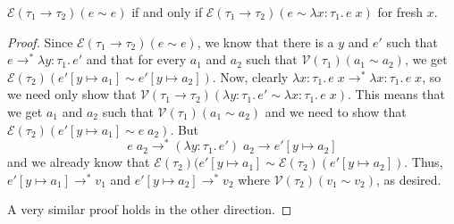 \documentclass{lecturenotes}
\newcommand{\tabs}[3]{\ensuremath{\lambda #1 \colon #2.\,#3}}
\newcommand{\app}[2]{\ensuremath{#1\;#2}}
\begin{document}
\begin{lem}
  $\mathcal{E}(\tau_1 \to \tau_2)(e \sim e)$ if and only if $\mathcal{E}(\tau_1 \to \tau_2)(e \sim \tabs{x}{\tau_1}{\app{e}{x}})$ for fresh $x$.
\end{lem}
\begin{proof}
  Since $\mathcal{E}(\tau_1 \to \tau_2)(e \sim e)$, we know that there is a $y$ and $e'$ such that $e \to^\ast \tabs{y}{\tau_1}{e'}$ and that for every $a_1$ and $a_2$ such that $\mathcal{V}(\tau_1)(a_1 \sim a_2)$, we get $\mathcal{E}(\tau_2)(e'[y \mapsto a_1] \sim e'[y \mapsto a_2])$.
  Now, clearly $\tabs{x}{\tau_1}{\app{e}{x}} \to^\ast \tabs{x}{\tau_1}{\app{e}{x}}$, so we need only show that $\mathcal{V}(\tau_1 \to \tau_2)(\tabs{y}{\tau_1}{e'} \sim \tabs{x}{\tau_1}{\app{e}{x}})$.
  This means that we get $a_1$ and $a_2$ such that $\mathcal{V}(\tau_1)(a_1 \sim a_2)$ and we need to show that $\mathcal{E}(\tau_2)(e'[y \mapsto a_1] \sim \app{e}{a_2})$.
  But $$\app{e}{a_2} \to^\ast \app{(\tabs{y}{\tau_1}{e'})}{a_2} \to e'[y \mapsto a_2]$$ and we already know that $\mathcal{E}(\tau_2)(e'[y \mapsto a_1] \sim \mathcal{E}(\tau_2)(e'[y \mapsto a_2])$.
  Thus, $e'[y \mapsto a_1] \to^\ast v_1$ and $e'[y \mapsto a_2] \to^\ast v_2$ where $\mathcal{V}(\tau_2)(v_1 \sim v_2)$, as desired.

  A very similar proof holds in the other direction.
\end{proof}
\end{document}
